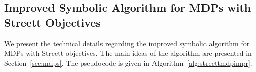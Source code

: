 \subsection{Improved Symbolic Algorithm for MDPs with Streett Objectives}

We present the technical details regarding the improved symbolic algorithm
for MDPs with Streett objectives. The main ideas of the algorithm are presented
in Section~\ref{sec:mdps}. The pseudocode is given in Algorithm~\ref{alg:streettmdpimpr}.


